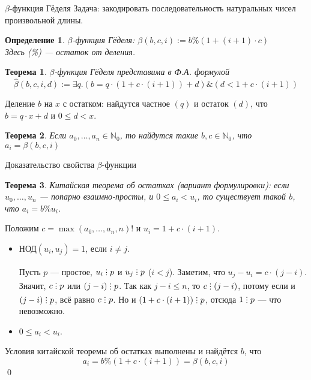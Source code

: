 \documentclass[aspectratio=169]{beamer}
\newtheorem{thm}{Теорема}[section]
\newtheorem{dfn}{Определение}[section]
\newcommand{\divisible}%
{\mathrel{\lower.2ex%
\vbox{\baselineskip=0.7ex\lineskiplimit=0pt%
\kern6pt \hbox{.}\hbox{.}\hbox{.}}%
}}
\begin{document}
\begin{frame}{$\beta$-функция Гёделя}
Задача: закодировать последовательность натуральных чисел произвольной длины.\pause
\begin{dfn}$\beta$-функция Гёделя: $\mathcal{\beta}(b,c,i) := b \% (1 + (i+1) \cdot c)$\\
Здесь (\%) --- остаток от деления.
\end{dfn}\pause
\begin{thm}$\beta$-функция Гёделя представима в Ф.А. формулой
$$\hat{\beta}(b,c,i,d) := \exists q.(b = q \cdot (1 + c \cdot (i+1)) + d) \& (d < 1 + c \cdot (i+1))$$
\end{thm}\pause\vspace{-0.3cm}
Деление $b$ на $x$ с остатком: найдутся частное $(q)$ и остаток $(d)$, что
$b = q\cdot x + d$ и $0 \le d < x$.
\pause
\begin{thm}Если $a_0, \dots, a_n \in \mathbb{N}_0$, то найдутся такие $b,c \in \mathbb{N}_0$, что
$a_i = \beta(b,c,i)$
\end{thm}
\end{frame}

\begin{frame}{Доказательство свойства $\beta$-функции}
\begin{thm}Китайская теорема об остатках (вариант формулировки): если $u_0, \dots, u_n$ --- попарно 
взаимно-просты, и $0 \le a_i < u_i$, то существует такой $b$, что $a_i = b \% u_i$.
\end{thm}\pause
Положим $c = \max(a_0,\dots,a_n,n)!$ и $u_i = 1+c\cdot(i+1)$.\pause
\begin{itemize}
\item $\text{НОД}(u_i,u_j) = 1$, если $i \ne j$.\pause

Пусть $p$ --- простое, $u_i\divisible p$ и $u_j\divisible p$ ($i < j$). \pause
Заметим, что $u_j-u_i = c \cdot (j-i)$. Значит, $c\divisible p$ или $(j-i)\divisible p$. \pause
Так как $j-i \le n$, то $c \divisible (j-i)$, потому если и $(j-i)\divisible p$, всё равно $c \divisible p$. \pause
Но и $(1+c\cdot(i+1))\divisible p$, отсюда $1 \divisible p$ --- что невозможно. \pause
\item $0 \le a_i < u_i$.\pause
\end{itemize}
Условия китайской теоремы об остатках выполнены и найдётся $b$, что \vspace{-0.2cm}
$$a_i = b \% (1 + c\cdot(i+1)) = \beta(b,c,i)$$
\qed
\end{frame}
\end{document}
